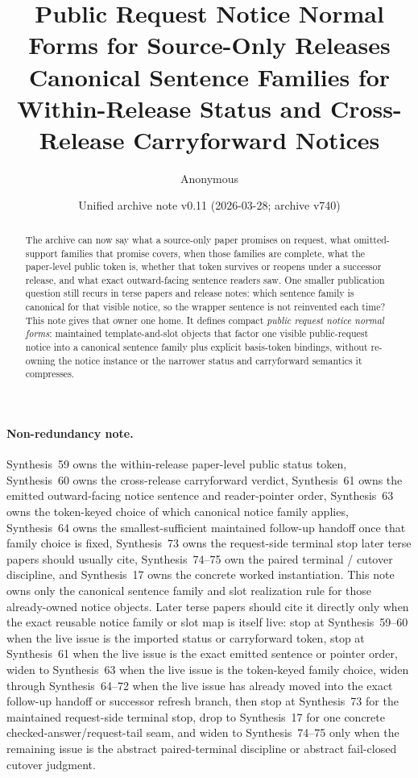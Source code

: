 \documentclass[11pt]{article}
\title{Public Request Notice Normal Forms for Source-Only Releases\\\large Canonical Sentence Families for Within-Release Status and Cross-Release Carryforward Notices}
\author{Anonymous}
\date{Unified archive note v0.11 (2026-03-28; archive v740)}
\begin{document}
\maketitle

\begin{abstract}
The archive can now say what a source-only paper promises on request, what omitted-support families that promise covers, when those families are complete, what the paper-level public token is, whether that token survives or reopens under a successor release, and what exact outward-facing sentence readers saw. One smaller publication question still recurs in terse papers and release notes: which sentence family is canonical for that visible notice, so the wrapper sentence is not reinvented each time? This note gives that owner one home. It defines compact \emph{public request notice normal forms}: maintained template-and-slot objects that factor one visible public-request notice into a canonical sentence family plus explicit basis-token bindings, without re-owning the notice instance or the narrower status and carryforward semantics it compresses.
\end{abstract}

\paragraph{Non-redundancy note.}
Synthesis~59 owns the within-release paper-level public status token, Synthesis~60 owns the cross-release carryforward verdict, Synthesis~61 owns the emitted outward-facing notice sentence and reader-pointer order, Synthesis~63 owns the token-keyed choice of which canonical notice family applies, Synthesis~64 owns the smallest-sufficient maintained follow-up handoff once that family choice is fixed, Synthesis~73 owns the request-side terminal stop later terse papers should usually cite, Synthesis~74--75 own the paired terminal / cutover discipline, and Synthesis~17 owns the concrete worked instantiation.\cite{series:publicrequeststatusenvelopes,series:publicrequestcarryforward,series:publicrequestnotices,series:publicrequestnoticeselections,series:publicrequestresponsemenus,series:publicrequestresponsepacketrefreshresponsepacketclosureverdicts,series:pairedterminalcitationdiscipline,series:pairedterminalcutoverrule,series:workedexample}
This note owns only the canonical sentence family and slot realization rule for those already-owned notice objects. Later terse papers should cite it directly only when the exact reusable notice family or slot map is itself live: stop at Synthesis~59--60 when the live issue is the imported status or carryforward token, stop at Synthesis~61 when the live issue is the exact emitted sentence or pointer order, widen to Synthesis~63 when the live issue is the token-keyed family choice, widen through Synthesis~64--72 when the live issue has already moved into the exact follow-up handoff or successor refresh branch, then stop at Synthesis~73 for the maintained request-side terminal stop, drop to Synthesis~17 for one concrete checked-answer/request-tail seam, and widen to Synthesis~74--75 only when the remaining issue is the abstract paired-terminal discipline or abstract fail-closed cutover judgment.
\end{document}
